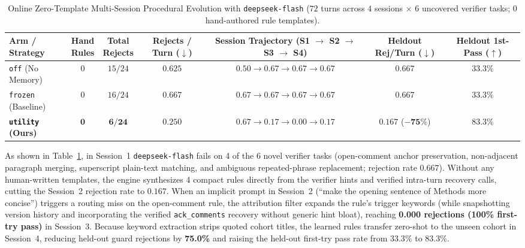 \documentclass[11pt,a4paper]{article}
\makeatletter
\newcommand{\thead}[1]{\begin{tabular}[c]{@{}c@{}}#1\end{tabular}}
\makeatother
\begin{document}
\begin{table}[!t]
\centering
\caption{Online Zero-Template Multi-Session Procedural Evolution with \texttt{deepseek-flash} ($72$ turns across $4$ sessions $\times$ $6$ uncovered verifier tasks; $0$ hand-authored rule templates).}
\label{tab:zero_template_pilot}
\vspace{2pt}
\small
\setlength{\tabcolsep}{0pt}
\begin{tabular*}{\textwidth}{@{\extracolsep{\fill}}lcccccc@{}}
\toprule
\textbf{Arm / Strategy} & \thead{\textbf{Hand}\\\textbf{Rules}} & \thead{\textbf{Total}\\\textbf{Rejects}} & \thead{\textbf{Rejects /}\\\textbf{Turn ($\downarrow$)}} & \thead{\textbf{Session Trajectory}\\\textbf{(S1 $\to$ S2 $\to$ S3 $\to$ S4)}} & \thead{\textbf{Heldout}\\\textbf{Rej/Turn ($\downarrow$)}} & \thead{\textbf{Heldout}\\\textbf{1st-Pass ($\uparrow$)}} \\
\midrule
\texttt{off} (No Memory) & $0$ & $15 / 24$ & $0.625$ & $0.50 \to 0.67 \to 0.67 \to 0.67$ & $0.667$ & $33.3\%$ \\
\texttt{frozen} (Baseline) & $0$ & $16 / 24$ & $0.667$ & $0.67 \to 0.67 \to 0.67 \to 0.67$ & $0.667$ & $33.3\%$ \\
\textbf{\texttt{utility} (Ours)} & $\mathbf{0}$ & $\mathbf{6 / 24}$ & $\mathbf{0.250}$ & $0.67 \to \mathbf{0.17} \to \mathbf{0.00} \to \mathbf{0.17}$ & $\mathbf{0.167}$ ($\mathbf{-75\%}$) & $\mathbf{83.3\%}$ \\
\bottomrule
\end{tabular*}
\end{table}

As shown in Table~\ref{tab:zero_template_pilot}, in Session~1 \texttt{deepseek-flash} fails on 4 of the 6 novel verifier tasks (open-comment anchor preservation, non-adjacent paragraph merging, superscript plain-text matching, and ambiguous repeated-phrase replacement; rejection rate $0.667$). Without any human-written templates, the engine synthesizes 4 compact rules directly from the verifier hints and verified intra-turn recovery calls, cutting the Session~2 rejection rate to $0.167$. When an implicit prompt in Session~2 (``make the opening sentence of Methods more concise'') triggers a routing miss on the open-comment rule, the attribution filter expands the rule's trigger keywords (while snapshotting version history and incorporating the verified \texttt{ack\_comments} recovery without generic hint bloat), reaching \textbf{0.000 rejections (100\% first-try pass)} in Session~3. Because keyword extraction strips quoted cohort titles, the learned rules transfer zero-shot to the unseen cohort in Session~4, reducing held-out guard rejections by \textbf{75.0\%} and raising the held-out first-try pass rate from $33.3\%$ to $83.3\%$.
\end{document}
